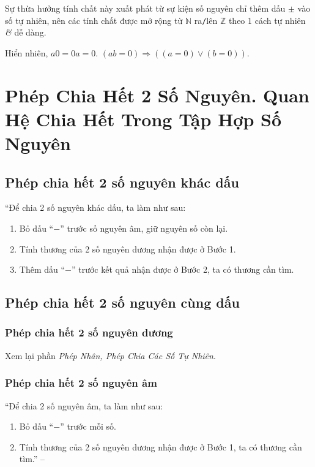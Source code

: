 \documentclass[oneside]{book}
\numberwithin{equation}{section}
\begin{document}
Sự thừa hưởng tính chất này xuất phát từ sự kiện số nguyên chỉ thêm dấu $\pm$ vào số tự nhiên, nên các tính chất được mở rộng từ $\mathbb{N}$ ra\texttt{/}lên $\mathbb{Z}$ theo 1 cách tự nhiên \textit{\&} dễ dàng.

Hiển nhiên, $a0 = 0a = 0$. $(ab = 0)\Rightarrow((a = 0)\lor(b = 0))$.


\section{Phép Chia Hết 2 Số Nguyên. Quan Hệ Chia Hết Trong Tập Hợp Số Nguyên}

\subsection{Phép chia hết 2 số nguyên khác dấu}
``Để chia 2 số nguyên khác dấu, ta làm như sau:
\begin{enumerate}
	\item Bỏ dấu ``$-$'' trước số nguyên âm, giữ nguyên số còn lại.
	\item Tính thương của 2 số nguyên dương nhận được ở Bước 1.
	\item Thêm dấu ``$-$'' trước kết quả nhận được ở Bước 2, ta có thương cần tìm.
\end{enumerate}

\subsection{Phép chia hết 2 số nguyên cùng dấu}

\subsubsection{Phép chia hết 2 số nguyên dương}
Xem lại phần \textit{Phép Nhân, Phép Chia Các Số Tự Nhiên}.

\subsubsection{Phép chia hết 2 số nguyên âm}
``Để chia 2 số nguyên âm, ta làm như sau:
\begin{enumerate}
	\item Bỏ dấu ``$-$'' trước mỗi số.
	\item Tính thương của 2 số nguyên dương nhận được ở Bước 1, ta có thương cần tìm.'' -- \cite[p. 85]{Thai_Anh_Dat_Ha_Loan_Nam_Quang_Toan_6_tap_1}
\end{enumerate}
\end{document}
